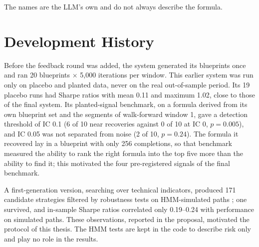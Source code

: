 \documentclass[12pt,a4paper,oneside]{book}
\theoremstyle{definition}
\begin{document}
The names are the LLM's own and do not always describe the formula.

\chapter{Development History}
\label{app:history}

Before the feedback round was added, the system generated its blueprints once and ran 20 blueprints $\times$ 5,000 iterations per window. This earlier system was run only on placebo and planted data, never on the real out-of-sample period. Its 19 placebo runs had Sharpe ratios with mean 0.11 and maximum 1.02, close to those of the final system. Its planted-signal benchmark, on a formula derived from its own blueprint set and the segments of walk-forward window 1, gave a detection threshold of IC 0.1 (6 of 10 near recoveries against 0 of 10 at IC 0, $p = 0.005$), and IC 0.05 was not separated from noise (2 of 10, $p = 0.24$). The formula it recovered lay in a blueprint with only 256 completions, so that benchmark measured the ability to rank the right formula into the top five more than the ability to find it; this motivated the four pre-registered signals of the final benchmark.

A first-generation version, searching over technical indicators, produced 171 candidate strategies filtered by robustness tests on HMM-simulated paths \cite{hamilton1989,rabiner1989,kunsch1989}; one survived, and in-sample Sharpe ratios correlated only 0.19--0.24 with performance on simulated paths. These observations, reported in the proposal, motivated the protocol of this thesis. The HMM tests are kept in the code to describe risk only and play no role in the results.
\end{document}
